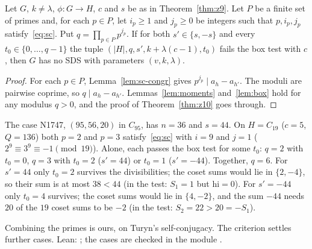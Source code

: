 \begin{theorem}\label{thm:z22}
Let $G$, $k \neq \lambda$, $\phi \colon G \to H$, $c$ and $s$ be as in Theorem~\ref{thm:z9}.
Let $P$ be a finite set of primes and, for each $p \in P$, let $i_p \ge 1$ and $j_p \ge 0$ be
integers such that $p, i_p, j_p$ satisfy~\eqref{eq:sc}. Put $q = \prod_{p \in P} p^{j_p}$. If
for both $s' \in \{s, -s\}$ and every $t_0 \in \{0, \dots, q - 1\}$ the tuple
$(|H|, q, s', k + \lambda(c-1), t_0)$ fails the box test with $c$, then $G$ has no SDS with
parameters $(v,k,\lambda)$.
\end{theorem}

\begin{proof}
For each $p \in P$, Lemma~\ref{lem:sc-congr} gives $p^{j_p} \mid a_h - a_{h'}$. The moduli
are pairwise coprime, so $q \mid a_h - a_{h'}$. Lemmas~\ref{lem:moments} and~\ref{lem:box}
hold for any modulus $q > 0$, and the proof of Theorem~\ref{thm:z10} goes through.
\end{proof}

\begin{example}
The case N1747, $(95, 56, 20)$ in $C_{95}$, has $n = 36$ and $s = 44$. On $H = C_{19}$
($c = 5$, $Q = 136$) both $p = 2$ and $p = 3$ satisfy~\eqref{eq:sc} with $i = 9$ and $j = 1$
($2^9 \equiv 3^9 \equiv -1 \pmod{19}$). Alone, each passes the box test for some $t_0$: $q = 2$
with $t_0 = 0$, $q = 3$ with $t_0 = 2$ ($s' = 44$) or $t_0 = 1$ ($s' = -44$). Together,
$q = 6$. For $s' = 44$ only $t_0 = 2$ survives the divisibilities; the coset sums would lie in
$\{2, -4\}$, so their sum is at most $38 < 44$ (in the test: $S_1 = 1$ but $\mathrm{hi} = 0$).
For $s' = -44$ only $t_0 = 4$ survives; the coset sums would lie in $\{4, -2\}$, and the sum
$-44$ needs $20$ of the $19$ coset sums to be $-2$ (in the test: $S_2 = 22 > 20 = -S_1$).
\end{example}

\begin{remark}
Combining the primes is ours, on Turyn's self-conjugacy. The criterion settles 
further cases. Lean: ; the cases are
checked in the module .
\end{remark}
